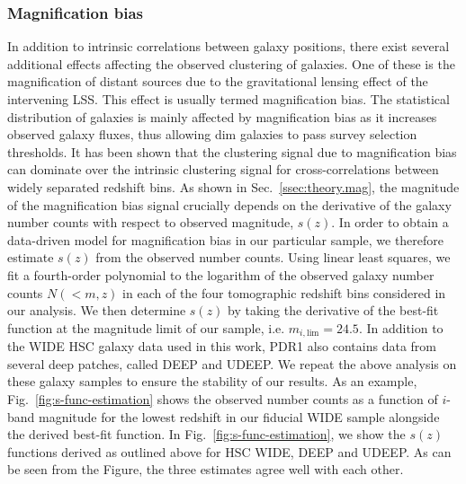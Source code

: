 \documentclass[a4paper,11pt]{article}
\begin{document}
 \subsubsection{Magnification bias}
In addition to intrinsic correlations between galaxy positions, there exist several additional effects affecting the observed clustering of galaxies. One of these is the magnification of distant sources due to the gravitational lensing effect of the intervening LSS. This effect is usually termed magnification bias. The statistical distribution of galaxies is mainly affected by magnification bias as it increases observed galaxy fluxes, thus allowing dim galaxies to pass survey selection thresholds. It has been shown that the clustering signal due to magnification bias can dominate over the intrinsic clustering signal for cross-correlations between widely separated redshift bins. As shown in Sec.~\ref{ssec:theory.mag}, the magnitude of the magnification bias signal crucially depends on the derivative of the galaxy number counts with respect to observed magnitude, $s(z)$. In order to obtain a data-driven model for magnification bias in our particular sample, we therefore estimate $s(z)$ from the observed number counts. Using linear least squares, we fit a fourth-order polynomial to the logarithm of the observed galaxy number counts $N(<m, z)$ in each of the four tomographic redshift bins considered in our analysis. We then determine $s(z)$ by taking the derivative of the best-fit function at the magnitude limit of our sample, i.e. $m_{i, \mathrm{lim}} = 24.5$. In addition to the WIDE HSC galaxy data used in this work, PDR1 also contains data from several deep patches, called DEEP and UDEEP. We repeat the above analysis on these galaxy samples to ensure the stability of our results. As an example, Fig.~\ref{fig:s-func-estimation} shows the observed number counts as a function of $i$-band magnitude for the lowest redshift in our fiducial WIDE sample alongside the derived best-fit function. In Fig.~\ref{fig:s-func-estimation}, we show the $s(z)$ functions derived as outlined above for HSC WIDE, DEEP and UDEEP. As can be seen from the Figure, the three estimates agree well with each other.
\end{document}
